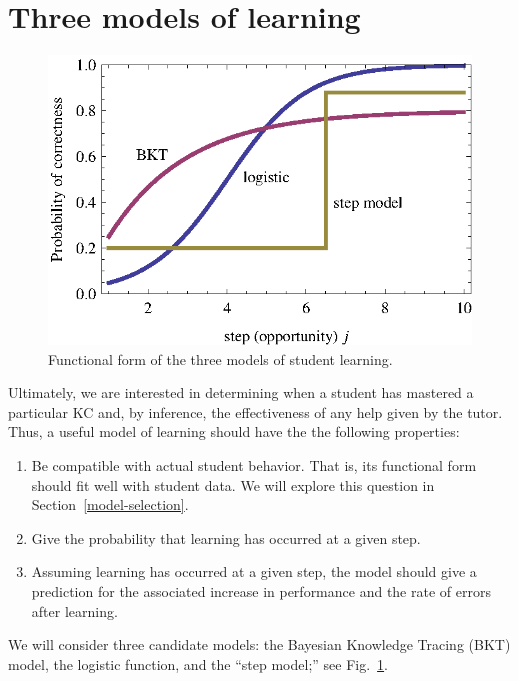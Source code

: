 \documentclass{edm_template}
\begin{document}
\section{Three models of learning}

\begin{figure}
  \centering \includegraphics{three-models.eps}
  \caption{Functional form of the three models of student learning.}
    \label{three-models}
\end{figure}

Ultimately, we are interested in determining when a student has mastered
a particular KC and, by inference, the effectiveness of
any help given by the tutor.  Thus, a useful model of learning
should  have the the following properties:
\label{model-criteria}
%
\begin{enumerate} 

\item Be compatible with actual student behavior.
      That is, its
      functional form should fit well with student data.
      We will explore this question in Section~\ref{model-selection}.  

\item \label{crit:step}
      Give the probability that learning has occurred at a given step.

\item  \label{crit:perform}
     Assuming learning has occurred at a given step, the model
     should give a prediction for the 
     associated increase in performance and 
     the rate of errors after learning.

\end{enumerate}
%
We will consider three candidate models:  
the Bayesian Knowledge Tracing (BKT) model, the logistic function,
and the ``step model;''
see Fig.~\ref{three-models}.
\end{document}
